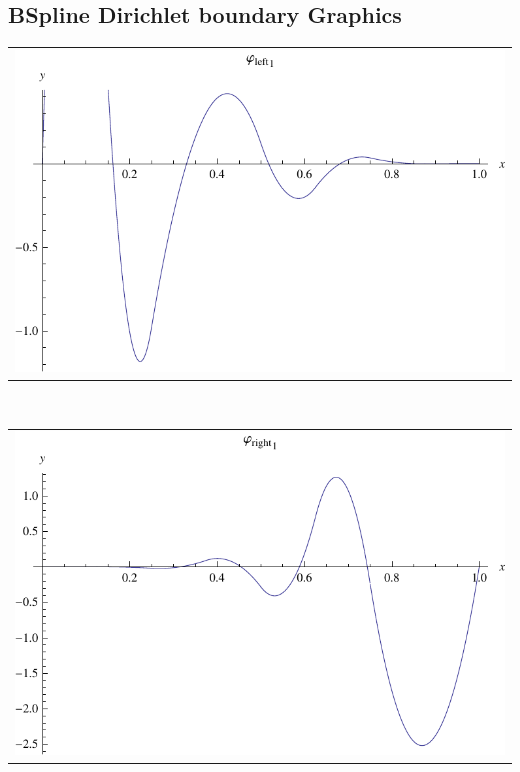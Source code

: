 \documentclass{article}
\begin{document}
\begin{landscape}
\subsection{BSpline Dirichlet boundary Graphics}
\begin{tabular}{c}
\includegraphics[width=20.cm]{quadratic_bspline_dleft_1.pdf}\end{tabular} 
 \\ 
\begin{tabular}{c}
\includegraphics[width=20.cm]{quadratic_bspline_dright_1.pdf}\end{tabular} 
 \end{landscape}
\end{document}
